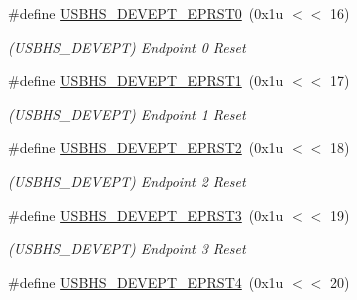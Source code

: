 \begin{DoxyCompactItemize}
\mbox{\label{group__SAME70__USBHS_gaa1dded3e04fd3b1b0bb6974490c7eeb4}} 
\#define \mbox{\hyperlink{group__SAME70__USBHS_gaa1dded3e04fd3b1b0bb6974490c7eeb4}{U\+S\+B\+H\+S\+\_\+\+D\+E\+V\+E\+P\+T\+\_\+\+E\+P\+R\+S\+T0}}~(0x1u $<$$<$ 16)
\begin{DoxyCompactList}\small\item\em (U\+S\+B\+H\+S\+\_\+\+D\+E\+V\+E\+PT) Endpoint 0 Reset \end{DoxyCompactList}\item 
\mbox{\label{group__SAME70__USBHS_ga64ccf2f6332cb69a6bcd437af4aa8de8}} 
\#define \mbox{\hyperlink{group__SAME70__USBHS_ga64ccf2f6332cb69a6bcd437af4aa8de8}{U\+S\+B\+H\+S\+\_\+\+D\+E\+V\+E\+P\+T\+\_\+\+E\+P\+R\+S\+T1}}~(0x1u $<$$<$ 17)
\begin{DoxyCompactList}\small\item\em (U\+S\+B\+H\+S\+\_\+\+D\+E\+V\+E\+PT) Endpoint 1 Reset \end{DoxyCompactList}\item 
\mbox{\label{group__SAME70__USBHS_gabe64f2436583cfadfcb6f9ea4615a793}} 
\#define \mbox{\hyperlink{group__SAME70__USBHS_gabe64f2436583cfadfcb6f9ea4615a793}{U\+S\+B\+H\+S\+\_\+\+D\+E\+V\+E\+P\+T\+\_\+\+E\+P\+R\+S\+T2}}~(0x1u $<$$<$ 18)
\begin{DoxyCompactList}\small\item\em (U\+S\+B\+H\+S\+\_\+\+D\+E\+V\+E\+PT) Endpoint 2 Reset \end{DoxyCompactList}\item 
\mbox{\label{group__SAME70__USBHS_gaa53657d7905f8b1def9da56935a73c87}} 
\#define \mbox{\hyperlink{group__SAME70__USBHS_gaa53657d7905f8b1def9da56935a73c87}{U\+S\+B\+H\+S\+\_\+\+D\+E\+V\+E\+P\+T\+\_\+\+E\+P\+R\+S\+T3}}~(0x1u $<$$<$ 19)
\begin{DoxyCompactList}\small\item\em (U\+S\+B\+H\+S\+\_\+\+D\+E\+V\+E\+PT) Endpoint 3 Reset \end{DoxyCompactList}\item 
\mbox{\label{group__SAME70__USBHS_ga9fc2be8154c74313a16be3080dc5e995}} 
\#define \mbox{\hyperlink{group__SAME70__USBHS_ga9fc2be8154c74313a16be3080dc5e995}{U\+S\+B\+H\+S\+\_\+\+D\+E\+V\+E\+P\+T\+\_\+\+E\+P\+R\+S\+T4}}~(0x1u $<$$<$ 20)
$$
\end{DoxyCompactItemize}
